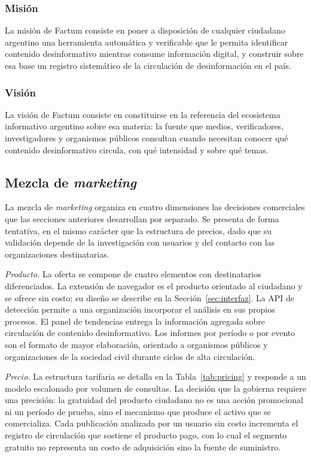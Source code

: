 \subsubsection{Misión}

La misión de Factum consiste en poner a disposición de cualquier ciudadano argentino una herramienta automática y verificable que le permita identificar contenido desinformativo mientras consume información digital, y construir sobre esa base un registro sistemático de la circulación de desinformación en el país.

\subsubsection{Visión}

La visión de Factum consiste en constituirse en la referencia del ecosistema informativo argentino sobre esa materia: la fuente que medios, verificadores, investigadores y organismos públicos consultan cuando necesitan conocer qué contenido desinformativo circula, con qué intensidad y sobre qué temas.

\subsection{Mezcla de \textit{marketing}}

La mezcla de \textit{marketing} organiza en cuatro dimensiones \parencite{KotlerKeller2016} las decisiones comerciales que las secciones anteriores desarrollan por separado. Se presenta de forma tentativa, en el mismo carácter que la estructura de precios, dado que su validación depende de la investigación con usuarios y del contacto con las organizaciones destinatarias.

\textit{Producto.} La oferta se compone de cuatro elementos con destinatarios diferenciados. La extensión de navegador es el producto orientado al ciudadano y se ofrece sin costo; su diseño se describe en la Sección~\ref{sec:interfaz}. La API de detección permite a una organización incorporar el análisis en sus propios procesos. El panel de tendencias entrega la información agregada sobre circulación de contenido desinformativo. Los informes por período o por evento son el formato de mayor elaboración, orientado a organismos públicos y organizaciones de la sociedad civil durante ciclos de alta circulación.

\textit{Precio.} La estructura tarifaria se detalla en la Tabla~\ref{tab:pricing} y responde a un modelo escalonado por volumen de consultas. La decisión que la gobierna requiere una precisión: la gratuidad del producto ciudadano no es una acción promocional ni un período de prueba, sino el mecanismo que produce el activo que se comercializa. Cada publicación analizada por un usuario sin costo incrementa el registro de circulación que sostiene el producto pago, con lo cual el segmento gratuito no representa un costo de adquisición sino la fuente de suministro.

